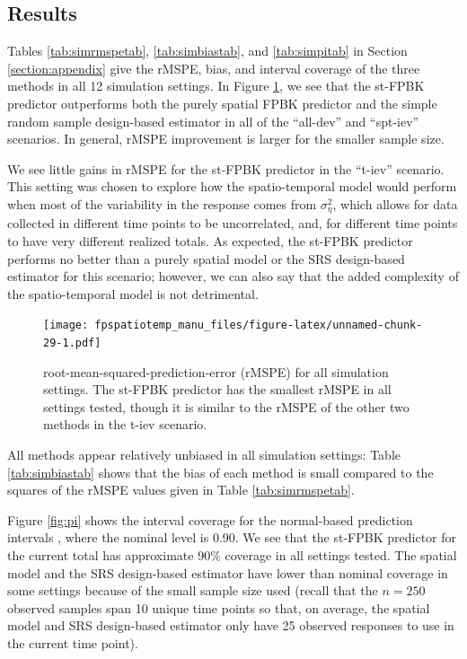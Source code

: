 \documentclass[]{interact}
\theoremstyle{plain}%
\theoremstyle{definition}
\theoremstyle{remark}
\begin{document}
\subsection{Results}

Tables \ref{tab:simrmspetab}, \ref{tab:simbiastab}, and
\ref{tab:simpitab} in Section \ref{section:appendix} give the rMSPE,
bias, and interval coverage of the three methods in all 12 simulation
settings. In Figure \ref{fig:rmspe}, we see that the st-FPBK predictor
outperforms both the purely spatial FPBK predictor and the simple random
sample design-based estimator in all of the ``all-dev'' and ``spt-iev''
scenarios. In general, rMSPE improvement is larger for the smaller
sample size.

We see little gains in rMSPE for the st-FPBK predictor in the ``t-iev''
scenario. This setting was chosen to explore how the spatio-temporal
model would perform when most of the variability in the response comes
from \(\sigma^2_{\eta}\), which allows for data collected in different
time points to be uncorrelated, and, for different time points to have
very different realized totals. As expected, the st-FPBK predictor
performs no better than a purely spatial model or the SRS design-based
estimator for this scenario; however, we can also say that the added
complexity of the spatio-temporal model is not detrimental.

\begin{figure}
\centering
\texttt{[image: fpspatiotemp\_manu\_files/figure-latex/unnamed-chunk-29-1.pdf]}
\caption{\label{fig:rmspe} root-mean-squared-prediction-error (rMSPE)
for all simulation settings. The st-FPBK predictor has the smallest
rMSPE in all settings tested, though it is similar to the rMSPE of the
other two methods in the t-iev scenario.}
\end{figure}

All methods appear relatively unbiased in all simulation settings: Table
\ref{tab:simbiastab} shows that the bias of each method is small
compared to the squares of the rMSPE values given in Table
\ref{tab:simrmspetab}.

Figure \ref{fig:pi} shows the interval coverage for the normal-based
prediction intervals \citep{smith1980central}, where the nominal level
is 0.90. We see that the st-FPBK predictor for the current total has
approximate 90\% coverage in all settings tested. The spatial model and
the SRS design-based estimator have lower than nominal coverage in some
settings because of the small sample size used (recall that the
\(n = 250\) observed samples span 10 unique time points so that, on
average, the spatial model and SRS design-based estimator only have 25
observed responses to use in the current time point).
\end{document}
